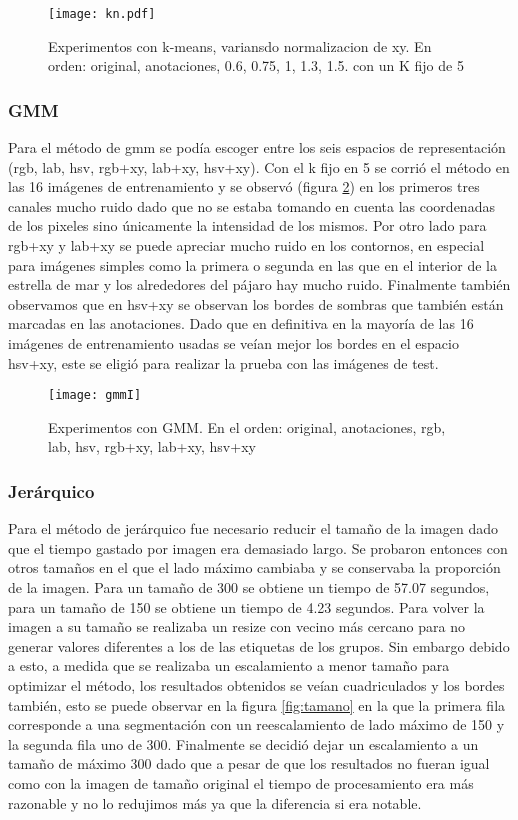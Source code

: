 \documentclass[10pt,twocolumn,letterpaper]{article}
\begin{document}
\begin{figure}[t]
\begin{center}
   \texttt{[image: kn.pdf]}
\end{center}
   \caption{Experimentos con k-means, variansdo normalizacion de xy. En orden: original, anotaciones, 0.6, 0.75, 1, 1.3, 1.5.  con un K fijo de 5}
\label{fig:kn}
\end{figure}

\subsubsection{GMM}
Para el método de gmm se podía escoger entre los seis espacios de representación (rgb, lab, hsv, rgb+xy, lab+xy, hsv+xy). Con el k fijo en 5 se corrió el método en las 16 imágenes de entrenamiento y se observó (figura \ref{fig:gmm}) en los primeros tres canales mucho ruido dado que no se estaba tomando en cuenta las coordenadas de los pixeles sino únicamente la intensidad de los mismos. Por otro lado para rgb+xy y lab+xy se puede apreciar mucho ruido en los contornos, en especial para imágenes simples como la primera o segunda en las que en el interior de la estrella de mar y los alrededores del pájaro hay mucho ruido. Finalmente también observamos que en hsv+xy se observan los bordes de sombras que también están marcadas en las anotaciones. Dado que en definitiva en la mayoría de las 16 imágenes de entrenamiento usadas se veían mejor los bordes en el espacio hsv+xy, este se eligió para realizar la prueba con las imágenes de test.

\begin{figure}[t]
    \texttt{[image: gmmI]}
    \caption{Experimentos con GMM. En el orden: original, anotaciones, rgb, lab, hsv, rgb+xy, lab+xy, hsv+xy}
\label{fig:gmm}
\end{figure}

\subsubsection{Jerárquico}
Para el método de jerárquico fue necesario reducir el tamaño de la imagen dado que el tiempo gastado por imagen era demasiado largo. Se probaron entonces con otros tamaños en el que el lado máximo cambiaba y se conservaba la proporción de la imagen. Para un tamaño de 300 se obtiene un tiempo de 57.07 segundos, para un tamaño de 150 se obtiene un tiempo de 4.23 segundos. Para volver la imagen a su tamaño se realizaba un resize con vecino más cercano para no generar valores diferentes a los de las etiquetas de los grupos. Sin embargo debido a esto, a medida que se realizaba un escalamiento a menor tamaño para optimizar el método, los resultados obtenidos se veían cuadriculados y los bordes también, esto se puede observar en la figura \ref{fig:tamano} en la que la primera fila corresponde a una segmentación con un reescalamiento de lado máximo de 150 y la segunda fila uno de 300. Finalmente se decidió dejar un escalamiento a un tamaño de máximo 300 dado que a pesar de que los resultados no fueran igual como con la imagen de tamaño original el tiempo de procesamiento era más razonable y no lo redujimos más ya que la diferencia si era notable.
\end{document}

